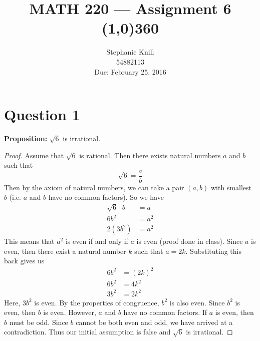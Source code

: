 \documentclass[11pt, oneside]{article}   	%
\begin{document}
\title{MATH 220 --- Assignment 6 \\
\line(1,0){360} \\              %
}
\author{
Stephanie Knill \\
54882113 \\
Due: February 25, 2016}

\date{}                   %
\maketitle




\section*{Question 1}

\textbf{Proposition:} $\sqrt{6}$ is irrational.

\begin{proof}
Assume that $\sqrt{6}$ is rational. Then there exists natural numbers $a$ and $b$ such that
$$\sqrt{6} = \frac{a}{b}$$
Then by the axiom of natural numbers, we can take a pair $(a,b)$ with smallest $b$ (i.e. $a$ and $b$ have no common factors). So we have
\begin{align*}
    \sqrt{6} \cdot b & = a \\
    6b^2 & =a^2 \\
    2(3b^2) & = a^2
\end{align*}
This means that $a^2$ is even if and only if $a$ is even (proof done in class). Since $a$ is even, then there exist a natural number $k$ such that $a=2k$. Substituting this back gives us
\begin{align*}
	6b^2 & =(2k)^2 \\
	6b^2 & = 4k^2 \\
	3b^2 & = 2k^2 
\end{align*}
Here, $3b^2$ is even. By the properties of congruence, $b^2$ is also even. Since $b^2$ is even, then $b$ is even. However, $a$ and $b$ have no common factors. If $a$ is even, then $b$ must be odd. Since $b$ cannot be both even and odd, we have arrived at a contradiction. Thus our initial assumption is false and $\sqrt{6}$ is irrational.
\end{proof}
\end{document}
